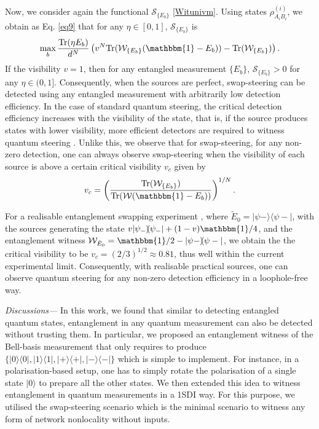 \documentclass[pra,twocolumn,showpacs]{revtex4-2}
\newcommand{\Tr}[1]{\mathrm{Tr}#1}
\newcommand{\ket}[1]{|#1\rangle}
\newcommand{\bra}[1]{\langle#1|}
\newcommand{\proj}[1]{\ket{#1}\!\!\bra{#1}}
\newcommand{\I}{\mathbbm{1}}
\theoremstyle{plain}
\theoremstyle{definition}
\theoremstyle{remark}
\begin{document}
Now, we consider again the functional $\mathcal{S}_{\{E_b\}}$ \eqref{Witunivm}. Using states $\rho^{(i)}_{A_iB_i}$, we obtain as Eq. 
\eqref{eq9} that for any $\eta\in[0,1]$, $\mathcal{S}_{\{E_b\}}$ is
\begin{equation}
   \max_{b}\frac{\Tr(\eta E_b)}{d^N}\left( v^N \Tr(\mathcal{W}_{\{E_b\}}(\I-E_b))-\Tr(\mathcal{W}_{\{E_b\}})\right).
\end{equation}
If the visibility $v=1$, then for any entangled measurement ${\{E_b\}}$, $ \mathcal{S}_{\{E_b\}}>0$ for any $\eta\in(0,1]$. Consequently, when the sources are perfect, swap-steering can be detected using any entangled measurement with arbitrarily low detection efficiency.
In the case of standard quantum steering, the critical detection efficiency increases with the visibility of the state, that is, if the source produces states with lower visibility, more efficient detectors are required to witness quantum steering \cite{Srivastav_2022,Vallone_2013}. Unlike this, we observe that for swap-steering, for any non-zero detection, one can always observe swap-steering when the visibility of each source is above a certain critical visibility $v_c$ given by
\begin{eqnarray}
    v_c=\left(\frac{\Tr(\mathcal{W}_{\{E_b\}})}{\Tr(\mathcal{W}(\I-E_b))}\right)^{1/N}.
\end{eqnarray}

For a realisable entanglement swapping experiment \cite{entexp1,doi:10.1126/sciadv.aea8571}, where $\tilde{E}_0=\proj{\psi-}$, with the sources generating the state $v\proj{\psi_-}+(1-v)\I/4$, and the entanglement witness $\mathcal{W}_{\tilde{E}_0}=\I/2-\proj{\psi-}$, we obtain the the critical visibility to be $v_c=(2/3)^{1/2}\approx 0.81$, thus well within the current experimental limit. Consequently, with realisable practical sources, one can observe quantum steering for any non-zero detection efficiency in a loophole-free way. 

{\it{Discussions---}} In this work, we found that similar to detecting entangled quantum states, entanglement in any quantum measurement can also be detected without trusting them. In particular, we proposed an entanglement witness of the Bell-basis measurement that only requires to produce $\{\proj{0},\proj{1},\proj{+},\proj{-}\}$ which is simple to implement. For instance, in a polarisation-based setup, one has to simply rotate the polarisation of a single state $\ket{0}$ to prepare all the other states. We then extended this idea to witness entanglement in quantum measurements in a 1SDI way. For this purpose, we utilised the swap-steering scenario which is the minimal scenario to witness any form of network nonlocality without inputs. 
\end{document}
